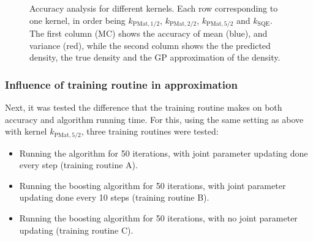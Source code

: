 \begin{figure}
	\caption[Accuracy analysis for different kernels.]{\label{kernelcomparison} Accuracy analysis for different kernels. Each row corresponding to one kernel, in order being $k_{\text{PMat},1/2}$, $k_{\text{PMat},2/2}$, $k_{\text{PMat},5/2}$ and $k_{\text{SQE}}$. The first column (MC) shows the accuracy of mean (blue), and variance (red), while the second column shows the the predicted density, the true density and the GP approximation of the density.}
\end{figure}

\subsubsection{Influence of training routine in approximation}
Next, it was tested the difference that the training routine makes on both accuracy and algorithm running time. For this, using the same setting as above with kernel $k_{\text{PMat},5/2}$, three training routines were tested:
\begin{itemize}
	\item Running the algorithm for 50 iterations, with joint parameter updating done every step (training routine A).
	\item Running the boosting algorithm for 50 iterations, with joint parameter updating done every 10 steps (training routine B).
	\item Running the boosting algorithm for 50 iterations, with no joint parameter updating (training routine C).
\end{itemize}

